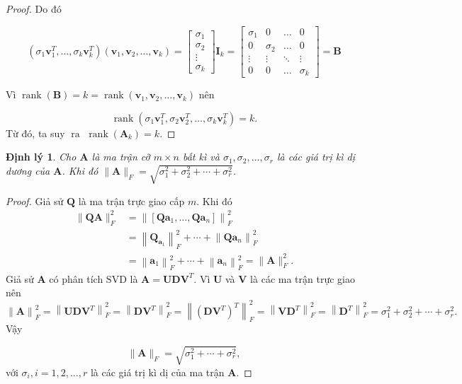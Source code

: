 \documentclass[12pt,a4paper,oneside]{report}
\newtheorem{dl}{Định lý}[section]
\numberwithin{equation}{section}
\begin{document}
\begin{proof}
Do đó

$$
\left(\sigma_{1} \mathbf{v}_{1}^{T}, \ldots, \sigma_{k} \mathbf{v}_{k}^{T}\right)\left(\mathbf{v}_{1}, \mathbf{v}_{2}, \ldots, \mathbf{v}_{k}\right)=\left[\begin{array}{c}
	\sigma_{1} \\
	\sigma_{2} \\
	\vdots \\
	\sigma_{k}
\end{array}\right] \mathbf{I}_{k}=\left[\begin{array}{cccc}
	\sigma_{1} & 0 & \ldots & 0 \\
	0 & \sigma_{2} & \ldots & 0 \\
	\vdots & \vdots & \ddots & \vdots \\
	0 & 0 & \ldots & \sigma_{k}
\end{array}\right]=\mathbf{B}
$$

Vì  $\operatorname{rank}(\mathbf{B})=k=\operatorname{rank}\left(\mathbf{v}_{1}, \mathbf{v}_{2}, \ldots, \mathbf{v}_{k}\right)$ nên

$$
\operatorname{rank}\left(\sigma_{1} \mathbf{v}_{1}^{T}, \sigma_{2} \mathbf{v}_{2}^{T}, \ldots, \sigma_{k} \mathbf{v}_{k}^{T}\right)=k.
$$
Từ đó, ta suy $\operatorname{ra~} \operatorname{rank}\left(\mathbf{A}_{k}\right)=k$.
\end{proof}
\begin{dl} \cite{linh2016}
 Cho $\mathbf{A}$ là ma trận cỡ $m \times n$ bất kì và $\sigma_{1}, \sigma_{2}, \ldots, \sigma_{r}$ là các giá trị kì dị dương của $\mathbf{A}$. Khi đó $\|\mathbf{A}\|_{F}=\sqrt{\sigma_{1}^{2}+\sigma_{2}^{2}+\cdots+\sigma_{r}^{2}}$.
\end{dl} 
\begin{proof}
Giả sử $\mathbf{Q}$ là ma trận trực giao cấp $m$. Khi đó
\begin{align*}
\|\mathbf{Q} \mathbf{A}\|_{F}^{2}&=\left\|\left[\mathbf{Q} \mathbf{a}_{1}, \ldots, \mathbf{Q} \mathbf{a}_{n}\right]\right\|_{F}^{2}\\
&=\left\|\mathbf{Q}_{\mathbf{a}_{1}}\right\|_{F}^{2}+\cdots+\left\|\mathbf{Q} \mathbf{a}_{n}\right\|_{F}^{2}\\
&=\left\|\mathbf{a}_{1}\right\|_{F}^{2}+\cdots+\left\|\mathbf{a}_{n}\right\|_{F}^{2}=\|\mathbf{A}\|_{F}^{2}.
\end{align*}
Giả sử $\mathbf{A}$ có phân tích $\mathrm{SVD}$ là $\mathbf{A}=\mathbf{U D V}^{T}$. Vì $\mathbf{U}$ và $\mathbf{V}$ là các ma trận trực giao nên
$$
\left.\|\mathbf{A}\right\|_{F}^{2}=\left\|\mathbf{U D V}^{T}\right\|_{F}^{2}=\left\| \mathbf{D V}^{T}\right\|_{F}^{2}=\left\|\left(\mathbf{D V}^{T}\right)^{T}\right\|_{F}^{2}=\left\| \mathbf{V D}^{T}\right\|_{F}^{2}=\left\| \mathbf{D}^{T}\right \|_{F}^{2}=\sigma_{1}^{2}+\sigma_{2}^{2}+\cdots+\sigma_{r}^{2}.
$$
Vậy

$$
\|\mathbf{A}\|_{F}=\sqrt{\sigma_{1}^{2}+\cdots+\sigma_{r}^{2}},
$$
với $\sigma_{i}, i=1,2, \ldots, r$ là các giá trị kì dị của ma trận $\mathbf{A}$.
\end{proof} 
\end{document}
